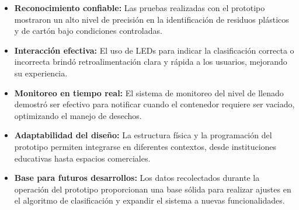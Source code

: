 \begin{itemize}
  \item \textbf{Reconocimiento confiable:} Las pruebas realizadas con el prototipo mostraron un alto nivel de precisión en la identificación de residuos plásticos y de cartón bajo condiciones controladas.
  \item \textbf{Interacción efectiva:} El uso de LEDs para indicar la clasificación correcta o incorrecta brindó retroalimentación clara y rápida a los usuarios, mejorando su experiencia.
  \item \textbf{Monitoreo en tiempo real:} El sistema de monitoreo del nivel de llenado demostró ser efectivo para notificar cuando el contenedor requiere ser vaciado, optimizando el manejo de desechos.
  \item \textbf{Adaptabilidad del diseño:} La estructura física y la programación del prototipo permiten integrarse en diferentes contextos, desde instituciones educativas hasta espacios comerciales.
  \item \textbf{Base para futuros desarrollos:} Los datos recolectados durante la operación del prototipo proporcionan una base sólida para realizar ajustes en el algoritmo de clasificación y expandir el sistema a nuevas funcionalidades.
\end{itemize}